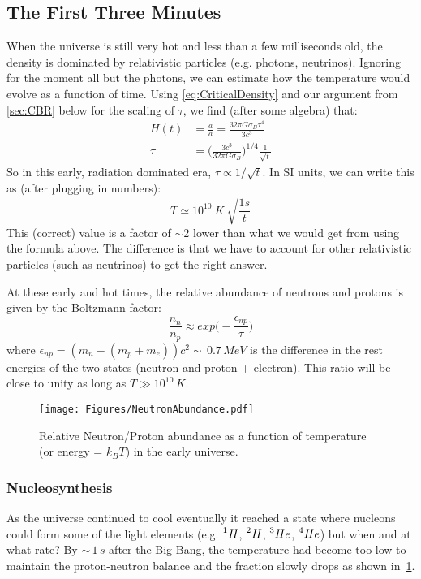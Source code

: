 \subsection{The First Three Minutes}
When the universe is still very hot and less than a few milliseconds old,
the density is dominated by relativistic particles (e.g. photons, neutrinos).
Ignoring for the moment all but the photons, we can estimate how the temperature would evolve as a function of time.
Using \cref{eq:CriticalDensity} and our argument from \cref{sec:CBR} below for the scaling of $\tau$, we find (after some algebra) that:
\begin{align}
H(t) &= \frac{\dot{a}}{a} = \frac{32 \pi G \sigma_B \tau^4}{3 c^3} \\
\tau &= \bigg(\frac{3 c^3}{32 \pi G \sigma_B}\bigg)^{1/4} \frac{1}{\sqrt{t}}
\end{align}
So in this early, radiation dominated era, $\tau \propto 1/\sqrt{t}$. In SI units, we can write this as (after plugging in numbers):
\begin{equation}
T \simeq 10^{10}~K~\sqrt{\frac{1 s}{t}}
\end{equation}
This (correct) value is a factor of $\sim 2$ lower than what we would get from using the formula above. The difference is that we have to account for other relativistic particles (such as neutrinos) to get the right answer.

At these early and hot times, the relative abundance of neutrons and protons is given by the Boltzmann factor:
\begin{equation}
\frac{n_n}{n_p} \approx exp\bigg(-\frac{\epsilon_{np}}{\tau}\bigg)
\label{eq:NeutronAbundance}
\end{equation}
where $\epsilon_{np} = (m_n - (m_p + m_e))c^2 \sim\,0.7\,MeV$ is the 
difference in the rest energies of the two states (neutron and proton + 
electron). This ratio will be close to unity as long as $T \gg 10^{10}\,K$.
\begin{figure}[h]
\centering
\texttt{[image: Figures/NeutronAbundance.pdf]}
\caption{Relative Neutron/Proton abundance as a function of temperature 
(or energy = $k_B T$) in the early universe.}
\label{fig:Neutrons}
\end{figure}

\subsubsection{Nucleosynthesis}
As the universe continued to cool eventually it reached a state where nucleons could form some 
of the light elements 
(e.g. $\prescript{1}{}H$, $\prescript{2}{}H$, $\prescript{3}{}He$, $\prescript{4}{}He$) 
but when and at what rate? 
By $\sim\,1\,s$ after the Big Bang, the temperature had become too low to maintain the 
proton-neutron balance and the fraction slowly drops as shown in~\cref{fig:Neutrons}.

